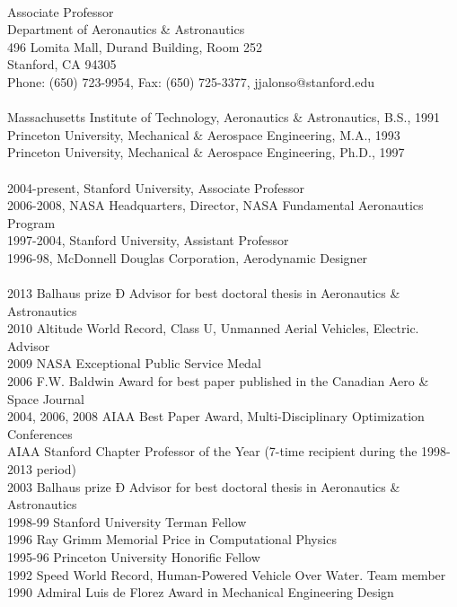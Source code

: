 \pagestyle{empty}

 \\
Associate Professor \\
Department of Aeronautics \& Astronautics \\
496 Lomita Mall, Durand Building, Room 252 \\
Stanford, CA 94305 \\
Phone: (650) 723-9954, Fax: (650) 725-3377, jjalonso@stanford.edu \\

 \\
Massachusetts Institute of Technology,  Aeronautics \& Astronautics,            B.S., 1991  \\
Princeton University,                   Mechanical \& Aerospace Engineering,    M.A., 1993  \\
Princeton University,                   Mechanical \& Aerospace Engineering,    Ph.D., 1997  \\

  \\
2004-present, Stanford University, Associate Professor \\
2006-2008, NASA Headquarters, Director, NASA Fundamental Aeronautics Program  \\
1997-2004, Stanford University, Assistant Professor  \\
1996-98, McDonnell Douglas Corporation, Aerodynamic Designer  \\

 \\
2013 Balhaus prize Ð Advisor for best doctoral thesis in Aeronautics \& Astronautics \\
2010 Altitude World Record, Class U, Unmanned Aerial Vehicles, Electric.  Advisor \\
2009 NASA Exceptional Public Service Medal\\
2006 F.W. Baldwin Award for best paper published in the Canadian Aero \& Space Journal\\
2004, 2006, 2008 AIAA Best Paper Award, Multi-Disciplinary Optimization Conferences\\
AIAA Stanford Chapter Professor of the Year (7-time recipient during the 1998-2013 period) \\
2003 Balhaus prize Ð Advisor for best doctoral thesis in Aeronautics \& Astronautics\\
1998-99 Stanford University Terman Fellow\\
1996 Ray Grimm Memorial Price in Computational Physics\\
1995-96 Princeton University Honorific Fellow\\
1992 Speed World Record, Human-Powered Vehicle Over Water.  Team member\\
1990 Admiral Luis de Florez Award in Mechanical Engineering Design\\


